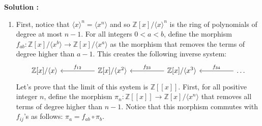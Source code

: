 \documentclass{article}
\newcommand{\Z}{\mathbb{Z}}
\begin{document}
\noindent \textbf{Solution :}
\begin{enumerate}[label=(\alph*)]
    \item First, notice that $\langle x \rangle^n = \langle x^n \rangle$ and so $\Z[x]/\langle x \rangle^n$ is the ring of polynomials of degree at most $n-1$. For all integers $0 < a < b$, define the morphism $f_{ab} : \Z[x]/\langle x^b \rangle \to \Z[x]/\langle x^a \rangle$ as the morphism that removes the terms of degree higher than $a-1$. This creates the following inverse system:
    \[\begin{tikzcd}
	{\mathbb{Z}[x]/\langle x \rangle} && {\mathbb{Z}[x]/\langle x^2 \rangle} && {\mathbb{Z}[x]/\langle x^3 \rangle} && \dots
	\arrow["{f_{12}}"', from=1-3, to=1-1]
	\arrow["{f_{23}}"', from=1-5, to=1-3]
	\arrow["{f_{34}}"', from=1-7, to=1-5]
    \end{tikzcd}\]
    Let's prove that the limit of this system is $\Z[[x]]$. First, for all positive integer $n$, define the morphism $\pi_n : \Z[[x]] \to \Z[x]/\langle x^n \rangle$ that removes all terms of degree higher than $n-1$. Notice that this morphism commutes with $f_{ij}$'s as follows: $\pi_a = f_{ab} \circ \pi_b$. 
    

\end{enumerate}
\end{document}
